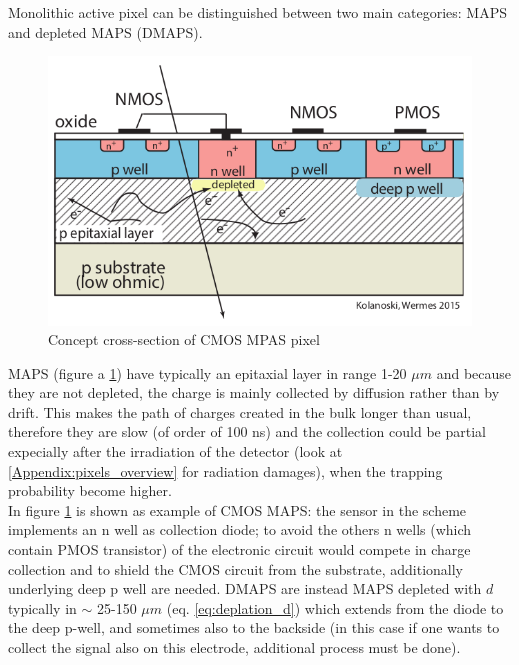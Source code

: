    Monolithic active pixel can be distinguished between two main categories: MAPS and depleted MAPS (DMAPS).\\
   \begin{figure}
      \centering
      \includegraphics[width=.4\linewidth]{figures/Pixel_detectors/MAPS_scheme.png}
      \caption{Concept cross-section of CMOS MPAS pixel}
      \label{fig:MAPS_scheme}
   \end{figure}
   MAPS (figure a \ref{fig:MAPS_scheme}) have typically an epitaxial layer in range 1-20 $\mu m$ and because they are not depleted, the charge is mainly collected by diffusion rather than by drift. This makes the path of charges created in the bulk longer than usual, therefore they are slow (of order of 100 ns) and the collection could be partial expecially after the irradiation of the detector (look at \ref{Appendix:pixels_overview} for radiation damages), when the trapping probability become higher. \\
   In figure \ref{fig:MAPS_scheme} is shown as example of CMOS MAPS: the sensor in the scheme implements an n well as collection diode; to avoid the others n wells (which contain PMOS transistor) of the electronic circuit would compete in charge collection and to shield the CMOS circuit from the substrate, additionally underlying deep p well are needed.
   DMAPS are instead MAPS depleted with $d$ typically in $\sim$ 25-150 $\mu m$ (eq. \ref{eq:deplation_d}) which extends from the diode to the deep p-well, and sometimes also to the backside (in this case if one wants to collect the signal also on this electrode, additional process must be done).


